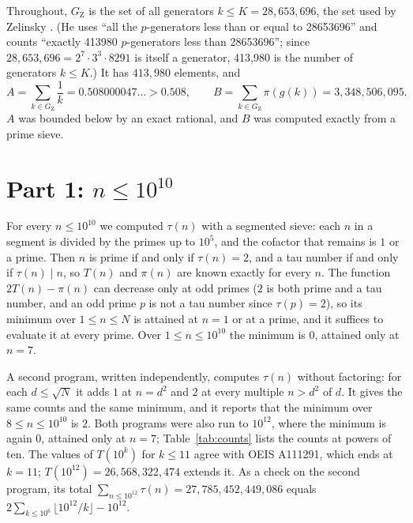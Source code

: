 \documentclass[11pt]{article}
\theoremstyle{remark}
\newcommand{\GZ}{G_{\mathrm{Z}}}
\begin{document}
Throughout, $\GZ$ is the set of all generators $k \le K = 28{,}653{,}696$, the set used by Zelinsky \cite[Theorem~22]{Ze}. (He uses ``all the $p$-generators less than or equal to 28653696'' and counts ``exactly 413980 $p$-generators less than 28653696''; since $28{,}653{,}696 = 2^7 \cdot 3^3 \cdot 8291$ is itself a generator, 413,980 is the number of generators $k \le K$.) It has $413{,}980$ elements, and
\[
A = \sum_{k \in \GZ} \frac1k = 0.508000047\ldots > 0.508, \qquad B = \sum_{k \in \GZ} \pi(g(k)) = 3{,}348{,}506{,}095 .
\]
$A$ was bounded below by an exact rational, and $B$ was computed exactly from a prime sieve.

\section{Part 1: \texorpdfstring{$n \le 10^{10}$}{n <= 10^10}}\label{sec:part1}

For every $n \le 10^{10}$ we computed $\tau(n)$ with a segmented sieve: each $n$ in a segment is divided by the primes up to $10^5$, and the cofactor that remains is $1$ or a prime. Then $n$ is prime if and only if $\tau(n) = 2$, and a tau number if and only if $\tau(n) \mid n$, so $T(n)$ and $\pi(n)$ are known exactly for every $n$. The function $2T(n) - \pi(n)$ can decrease only at odd primes ($2$ is both prime and a tau number, and an odd prime $p$ is not a tau number since $\tau(p) = 2$), so its minimum over $1 \le n \le N$ is attained at $n = 1$ or at a prime, and it suffices to evaluate it at every prime. Over $1 \le n \le 10^{10}$ the minimum is $0$, attained only at $n = 7$.

A second program, written independently, computes $\tau(n)$ without factoring: for each $d \le \sqrt N$ it adds $1$ at $n = d^2$ and $2$ at every multiple $n > d^2$ of $d$. It gives the same counts and the same minimum, and it reports that the minimum over $8 \le n \le 10^{10}$ is $2$. Both programs were also run to $10^{12}$, where the minimum is again $0$, attained only at $n = 7$; Table~\ref{tab:counts} lists the counts at powers of ten. The values of $T(10^k)$ for $k \le 11$ agree with OEIS A111291, which ends at $k = 11$; $T(10^{12}) = 26{,}568{,}322{,}474$ extends it. As a check on the second program, its total $\sum_{n \le 10^{12}} \tau(n) = 27{,}785{,}452{,}449{,}086$ equals $2\sum_{k \le 10^6} \lfloor 10^{12}/k \rfloor - 10^{12}$.
\end{document}
